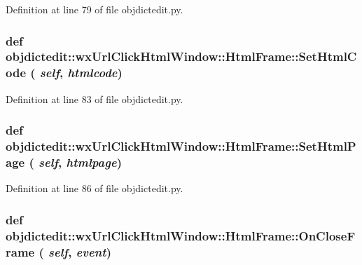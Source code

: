Definition at line 79 of file objdictedit.py.\hypertarget{classobjdictedit_1_1wxUrlClickHtmlWindow_1_1HtmlFrame_375043f928e987f104763ad6e3d118be}{
\subsubsection[SetHtmlCode]{\setlength{\rightskip}{0pt plus 5cm}def objdictedit::wx\-Url\-Click\-Html\-Window::Html\-Frame::Set\-Html\-Code ( {\em self},  {\em htmlcode})}}
\label{classobjdictedit_1_1wxUrlClickHtmlWindow_1_1HtmlFrame_375043f928e987f104763ad6e3d118be}




Definition at line 83 of file objdictedit.py.\hypertarget{classobjdictedit_1_1wxUrlClickHtmlWindow_1_1HtmlFrame_d55f13d2f73906fb8891fd8ab6282897}{
\subsubsection[SetHtmlPage]{\setlength{\rightskip}{0pt plus 5cm}def objdictedit::wx\-Url\-Click\-Html\-Window::Html\-Frame::Set\-Html\-Page ( {\em self},  {\em htmlpage})}}
\label{classobjdictedit_1_1wxUrlClickHtmlWindow_1_1HtmlFrame_d55f13d2f73906fb8891fd8ab6282897}




Definition at line 86 of file objdictedit.py.\hypertarget{classobjdictedit_1_1wxUrlClickHtmlWindow_1_1HtmlFrame_5cadc14f91eaeef5c2e001ccdf408264}{
\subsubsection[OnCloseFrame]{\setlength{\rightskip}{0pt plus 5cm}def objdictedit::wx\-Url\-Click\-Html\-Window::Html\-Frame::On\-Close\-Frame ( {\em self},  {\em event})}}
\label{classobjdictedit_1_1wxUrlClickHtmlWindow_1_1HtmlFrame_5cadc14f91eaeef5c2e001ccdf408264}




